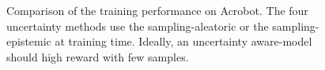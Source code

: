 \begin{figure}
    \vspace{-3mm}
    \caption{Comparison of the training performance on Acrobot. The four uncertainty methods use the sampling-aleatoric or the sampling-epistemic at training time. Ideally, an uncertainty aware-model should high reward with few samples.}
    \label{fig:strategy-training-performance-acrobot-main}
    \vspace{-5mm}
\end{figure}